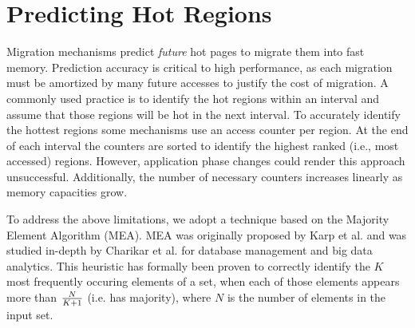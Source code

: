 
\section{Predicting Hot Regions}
\label{sec:MEA}


Migration mechanisms predict \textit{future} hot pages to migrate them into fast memory. Prediction accuracy is critical to high performance, as each migration must be amortized by many future accesses to justify the cost of migration.
A commonly used practice is to identify the hot regions within an interval 
and assume that those regions will be hot in the next interval. To accurately identify the hottest regions some mechanisms use an access counter per region. 
At the end of each interval the counters are sorted to identify the highest 
ranked (i.e., most accessed) regions. However, application phase changes could render this approach unsuccessful. Additionally, the number of necessary counters increases linearly as memory capacities grow.

To address the above limitations, we adopt a technique based on the Majority Element Algorithm (MEA). MEA was originally proposed by Karp et al. \cite{karp-mea} and was studied in-depth by Charikar et al. \cite{charikar-mea} for database management and big data analytics. This heuristic has formally been proven to correctly identify the $K$ most frequently occuring elements of a set, when each of those elements appears more than $N \over K+1$ (i.e. has majority), where $N$ is the number of elements in the input set. 


